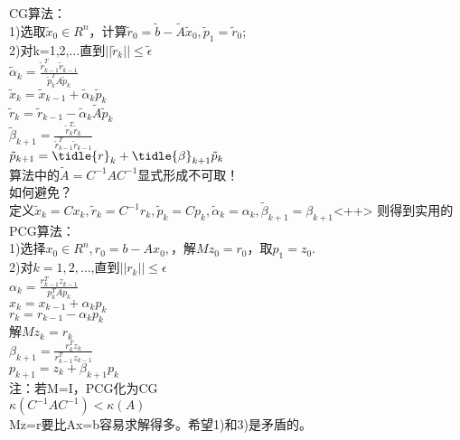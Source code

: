 \documentclass[cjk]{beamer}
\begin{document}
\begin{CJK*}{UTF8}{gbsn}
{	CG算法：\\
	1)选取$\tilde{x}_0 \in R^n$，计算$\tilde{r}_0=\tilde{b}-\tilde{A}\tilde{x}_0,\tilde{p}_1=\tilde{r}_0$;\\
	2)对k=1,2,$\ldots$直到$||\tilde{r}_k|| \le \tilde{\epsilon}$\\
	$\tilde{\alpha}_k = \frac {\tilde{r}_{k-1}^T\tilde{r}_{k-1}}{\tilde{p}_k^TA\tilde{p}_k}$	\\
	$\tilde{x}_k = \tilde{x}_{k-1} + \tilde{\alpha}_k\tilde{p}_k$	\\
	$\tilde{r}_k = \tilde{r}_{k-1} - \tilde{\alpha}_k\tilde{A}\tilde{p}_k$	\\
	$\tilde{\beta}_{k+1} = \frac{ \tilde{r}_k^T\tilde{r}_k}{\tilde{r}_{k-1}^T\tilde{r}_{k-1}}$ \\
	$\tilde{p}_{k+1} = \tidle{r}_k + \tidle{\beta}_{k+1}\tilde{p}_k$ \\
	算法中的$\tilde{A} = C^{-1}AC^{-1}$显式形成不可取！\\
	如何避免？\\
	定义$\tilde{x}_k = Cx_k, \tilde{r}_k = C^{-1}r_k, \tilde{p}_k = Cp_k,\tilde{\alpha}_k = \alpha_k, \tilde{\beta}_{k+1} = \beta_{k+1}$<++>
	则得到实用的PCG算法：\\
	1)选择$x_0 \in R^n, r_0 = b - Ax_0, $，解$Mz_0 = r_0$，取$p_1 = z_0.$\\
	2)对$k=1,2,\ldots$,直到$||r_k|| \le \epsilon$\\
	${\alpha}_k = \frac{r_{k-1}^Tz_{k-1}}{p_k^TAp_k}$\\
	$x_k = x_{k-1} + {\alpha}_kp_k$\\
	$r_k = r_{k-1} - {\alpha}_kp_k$\\
	解$Mz_k = r_k$\\
	${\beta}_{k+1} = \frac{r_k^Tz_k}{r_{k-1}^Tz_{k-1}}$\\
	$p_{k+1} = z_k + {\beta}_{k+1}p_k$\\
	注：若M=I，PCG化为CG\\
	$\kappa(C^{-1}AC^{-1})<\kappa(A)$\\
	Mz=r要比Ax=b容易求解得多。希望1)和3)是矛盾的。\\
	}
\end{CJK*}
\end{document}
